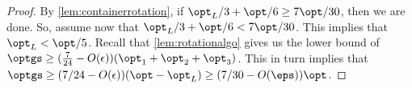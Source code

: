 \begin{proof}
    By \cref{lem:containerrotation}, if $\opt_L/3+\opt/6\ge 7\opt/30$, then we are done.
    So, assume now that $\opt_L/3+\opt/6< 7\opt/30$. This implies that $\opt_L< \opt/5$.
    Recall that \cref{lem:rotationalgo} gives us the lower bound of $\optgs\ge (\frac{7}{24}-O(\epsilon))(\opt_1+\opt_2+\opt_3)$.
    This in turn implies that $\optgs\ge (7/24-O(\epsilon))(\opt-\opt_L)\ge (7/30-O(\eps))\opt$. 

\end{proof}
